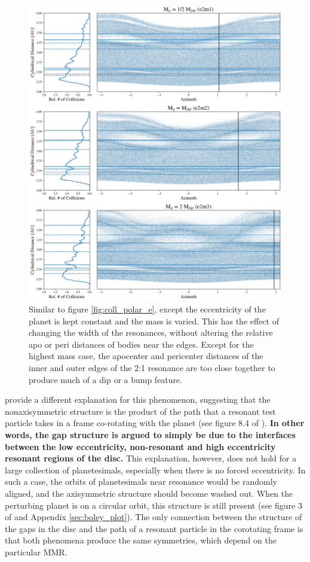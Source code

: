 \documentclass[fleqn,usenatbib]{mnras}
\begin{document}
\begin{figure}
    \includegraphics[width=\textwidth]{figures/coll_polar_m.png}
    \caption{Similar to figure \ref{fig:coll_polar_e}, except the eccentricity of the planet is kept constant and the mass is varied.
    This has the effect of changing the width of the resonances, without altering the relative apo or peri distances of
    bodies near the edges. Except for the highest mass case, the apocenter and pericenter distances of the inner and outer edges of the 2:1 
    resonance are too close together to produce much of a dip or a bump feature.\label{fig:coll_polar_m}}
\end{figure}

\citet{2016ApJ...818..159T} provide a different explanation for this phenomenon, suggesting that the nonaxisymmetric structure is the product 
of the path that a resonant test particle takes in a frame co-rotating with the planet (see figure 8.4 of \citet{1999ssd..book.....M}). \textbf{In other words, the gap structure is argued to simply be due to the interfaces between the low eccentricity, non-resonant and high eccentricity resonant regions of the disc.} This explanation, 
however, does not hold for a large collection of planetesimals, especially when there is no forced eccentricity. In such a case, the orbits of 
planetesimals near resonance would be randomly aligned, and the axisymmetric structure should become washed out. When the perturbing 
planet is on a circular orbit, this structure is still present (see figure 3 of \citet{2016ApJ...818..159T} and Appendix \ref{sec:boley_plot}). The only 
connection between the structure of the gaps in the disc and the path of a resonant particle in the corotating frame is that both phenomena produce the 
same symmetries, which depend on the particular MMR.
\end{document}
